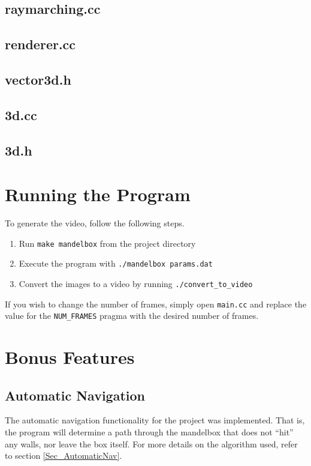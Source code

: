 \documentclass[11pt]{article}
\begin{document}
\subsection{raymarching.cc}


\subsection{renderer.cc}


\subsection{vector3d.h}


\subsection{3d.cc}


\subsection{3d.h}


\section{Running the Program}
To generate the video, follow the following steps.
\begin{enumerate}
\item Run \texttt{make mandelbox} from the project directory
\item Execute the program with \texttt{./mandelbox params.dat}
\item Convert the images to a video by running \texttt{./convert\_to\_video}
\end{enumerate}

If you wish to change the number of frames, simply open \texttt{main.cc} and replace the value for the \texttt{NUM\_FRAMES} pragma with the desired number of frames.

\section{Bonus Features}
\subsection{Automatic Navigation}
The automatic navigation functionality for the project was implemented. That is, the program will determine a path through the mandelbox that does not ``hit'' any walls, nor leave the box itself. For more details on the algorithm used, refer to section \ref{Sec_AutomaticNav}.
\end{document}

